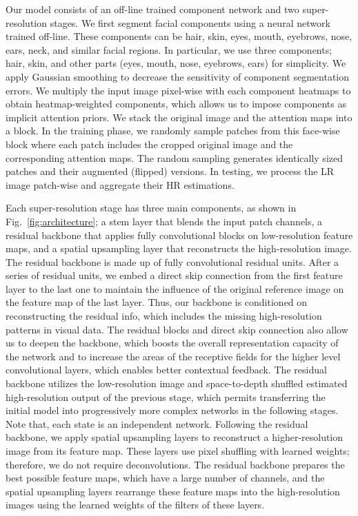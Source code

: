 \documentclass[10pt,twocolumn,letterpaper]{article}
\begin{document}
Our model consists of an off-line trained component network and two super-resolution stages. We first segment facial components using a neural network trained off-line. These components can be hair, skin, eyes, mouth, eyebrows, nose, ears, neck, and similar facial regions. In particular, we use three components; hair, skin, and other parts (eyes, mouth, nose, eyebrows, ears) for simplicity. We apply Gaussian smoothing to decrease the sensitivity of component segmentation errors. We multiply the input image pixel-wise with each component heatmaps to obtain heatmap-weighted components, which allows us to impose components as implicit attention priors. We stack the original image and the attention maps into a block. In the training phase, we randomly sample patches from this face-wise block where each patch includes the cropped original image and the corresponding attention maps. The random sampling generates identically sized patches and their augmented (flipped) versions. In testing, we process the LR image patch-wise and aggregate their HR estimations. 



Each super-resolution stage has three main components, as shown in Fig.~\ref{fig:architecture}; a stem layer that blends the input patch channels, a residual backbone that applies fully convolutional blocks on low-resolution feature maps, and a spatial upsampling layer that reconstructs the high-resolution image. The residual backbone is made up of fully convolutional residual units. After a series of residual units, we embed a direct skip connection from the first feature layer to the last one to maintain the influence of the original reference image on the feature map of the last layer. Thus, our backbone is conditioned on reconstructing the residual info, which includes the missing high-resolution patterns in visual data. The residual blocks and direct skip connection also allow us to deepen the backbone, which boosts the overall representation capacity of the network and to increase the areas of the receptive fields for the higher level convolutional layers, which enables better contextual feedback. The residual backbone utilizes the low-resolution image and space-to-depth shuffled estimated high-resolution output of the previous stage, which permits transferring the initial model into progressively more complex networks in the following stages. Note that, each state is an independent network. Following the residual backbone, we apply spatial upsampling layers to reconstruct a higher-resolution image from its feature map. These layers use pixel shuffling with learned weights; therefore, we do not require deconvolutions. The residual backbone prepares the best possible feature maps, which have a large number of channels, and the spatial upsampling layers rearrange these feature maps into the high-resolution images using the learned weights of the filters of these layers.  
\end{document}
